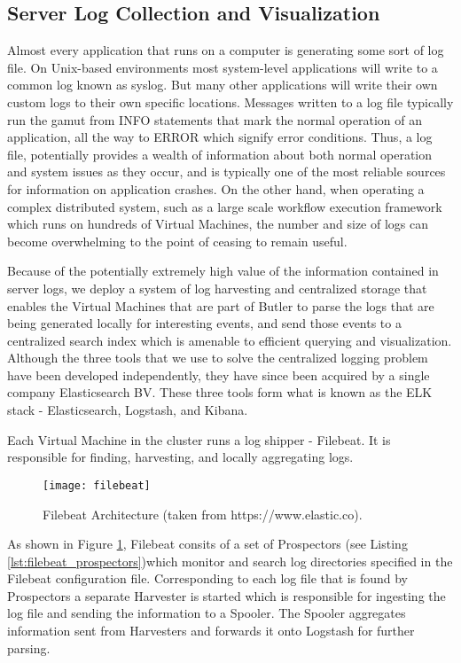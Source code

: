 \subsection{Server Log Collection and Visualization} 
\label{sec:design_log_collection}

Almost every application that runs on a computer is generating some sort of log file. On Unix-based environments most system-level applications will write to a common log known as syslog. But many other applications will write their own custom logs to their own specific locations. Messages written to a log file typically run the gamut from INFO statements that mark the normal operation of an application, all the way to ERROR which signify error conditions. Thus, a log file, potentially provides a wealth of information about both normal operation and system issues as they occur, and is typically one of the most reliable sources for information on application crashes. On the other hand, when operating a complex distributed system, such as a large scale workflow execution framework which runs on hundreds of Virtual Machines, the number and size of logs can become overwhelming to the point of ceasing to remain useful.  

Because of the potentially extremely high value of the information contained in server logs, we deploy a system of log harvesting and centralized storage that enables the Virtual Machines that are part of Butler to parse the logs that are being generated locally for interesting events, and send those events to a centralized search index which is amenable to efficient querying and visualization. Although the three tools that we use to solve the centralized logging problem have been developed independently, they have since been acquired by a single company Elasticsearch BV. These three tools form what is known as the ELK stack - Elasticsearch\autocite{Elasticsearch}, Logstash\autocite{Logstash}, and Kibana\autocite{Kibana}.

Each Virtual Machine in the cluster runs a log shipper - Filebeat. It is responsible for finding, harvesting, and locally aggregating logs.

\begin{figure}[h]
\texttt{[image: filebeat]}
\centering
\caption {Filebeat Architecture (taken from https://www.elastic.co).}
\label{fig:filebeat}
\end{figure}

As shown in Figure \ref{fig:filebeat}, Filebeat consits of a set of Prospectors (see Listing \ref{lst:filebeat_prospectors})which monitor and search log directories specified in the Filebeat configuration file. Corresponding to each log file that is found by Prospectors a separate Harvester is started which is responsible for ingesting the log file and sending the information to a Spooler. The Spooler aggregates information sent from Harvesters and forwards it onto Logstash for further parsing.

